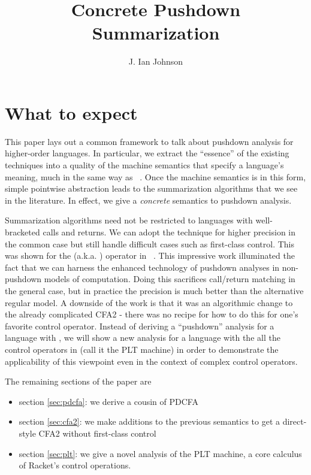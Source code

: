 \documentclass{llncs}
\title{Concrete Pushdown Summarization}
\author{J. Ian Johnson}
\institute{Northeastern University \\
           \email{ianj@ccs.neu.edu}}
\newcommand{\Scribtexttt}[1]{{\texttt{#1}}}
\newcommand{\SColorize}[2]{\color{#1}{#2}}
\newcommand{\inColor}[2]{{\Scribtexttt{\SColorize{#1}{#2}}}}
\newcommand{\rackett}[1]{\inColor{black}{#1}}
\begin{document}
\maketitle


\section{What to expect}
This paper lays out a common framework to talk about pushdown analysis
for higher-order languages. In particular, we extract the ``essence''
of the existing techniques into a quality of the machine semantics
that specify a language's meaning, much in the same way as
~\citet{dvanhorn:VanHorn2012Systematic}. Once the machine semantics
is in this form, simple pointwise abstraction leads to the
summarization algorithms that we see in the literature. In effect, we
give a \emph{concrete} semantics to pushdown analysis.

Summarization algorithms need not be restricted to languages with
well-bracketed calls and returns. We can adopt the technique for
higher precision in the common case but still handle difficult cases
such as first-class control. This was shown for the
\rackett{call-with-current-continuation} (a.k.a. \rackett{call/cc})
operator in ~\citet{ianjohnson:Vardoulakis2011Pushdown}. This
impressive work illuminated the fact that we can harness the enhanced
technology of pushdown analyses in non-pushdown models of
computation. Doing this sacrifices call/return matching in the general
case, but in practice the precision is much better than the
alternative regular model. A downside of the work is that it was an
algorithmic change to the already complicated CFA2 - there was no
recipe for how to do this for one's favorite control operator. Instead
of deriving a ``pushdown'' analysis for a language with
\rackett{call/cc}, we will show a new analysis for a language with the
all the control operators in \citet{ianjohnson:Flatt:2007:ADC:1291151.1291178} (call it the
PLT machine) in order to demonstrate the applicability of this
viewpoint even in the context of complex control operators.

The remaining sections of the paper are
\begin{itemize}
\item{section \ref{sec:pdcfa}: we derive a cousin of PDCFA}
\item{section \ref{sec:cfa2}: we make additions to the previous semantics to get a direct-style CFA2 without first-class control}
\item{section \ref{sec:plt}: we give a novel analysis of the PLT machine, a core calculus of Racket's control operations.}
\end{itemize}
\end{document}
